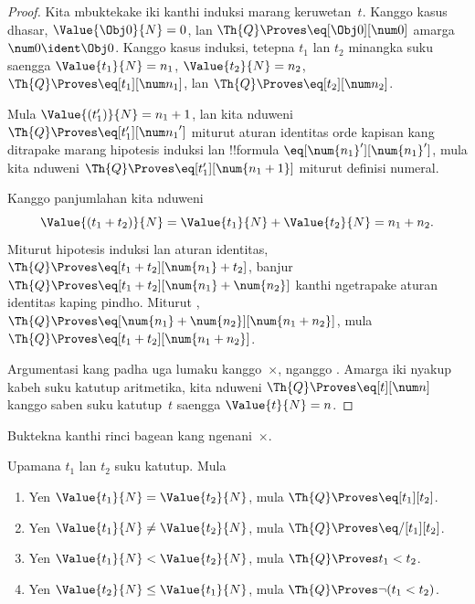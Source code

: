\documentclass[../../../include/open-logic-section]{subfiles}
\begin{document}
\begin{proof}
Kita mbuktekake iki kanthi induksi marang keruwetan~$t$. Kanggo kasus
dhasar, $\Value{\Obj 0}{N} = 0$, lan
$\Th{Q} \Proves \eq[\Obj 0][\num 0]$ amarga
$\num 0 \ident \Obj 0$.
%
Kanggo kasus induksi, tetepna $t_1$ lan $t_2$ minangka suku saengga
$\Value{t_1}{N} = n_1$, $\Value{t_2}{N} = n_2$,
$\Th{Q} \Proves \eq[t_1][\num n_1]$, lan
$\Th{Q} \Proves \eq[t_2][\num n_2]$.

Mula $\Value{(t_1')}{N} = n_1 + 1$, lan kita nduweni
$\Th{Q} \Proves \eq[t_1'][{\num n_1}']$ miturut aturan identitas
orde kapisan kang ditrapake marang hipotesis induksi lan !!{formula}
$\eq[\num{n_1}'][\num{n_1}']$,
mula kita nduweni $\Th{Q} \Proves \eq[t_1'][\num{n_1 + 1}]$
miturut definisi numeral.

Kanggo panjumlahan kita nduweni
\[
      \Value{(t_1 + t_2)}{N}
    = \Value{t_1}{N} + \Value{t_2}{N}
    = n_1 + n_2.
\]
Miturut hipotesis induksi lan aturan identitas,
$\Th{Q} \Proves \eq[t_1 + t_2][\num{n_1} + t_2]$, banjur
$\Th{Q} \Proves \eq[t_1 + t_2][\num{n_1} + \num{n_2}]$
kanthi ngetrapake aturan identitas kaping pindho.
Miturut ,
$\Th{Q} \Proves \eq[\num{n_1} + \num{n_2}][\num{n_1 + n_2}]$,
mula $\Th{Q} \Proves \eq[t_1 + t_2][\num{n_1 + n_2}]$.

Argumentasi kang padha uga lumaku kanggo~$\times$, nganggo
.
%
Amarga iki nyakup kabeh suku katutup aritmetika, kita nduweni
$\Th{Q} \Proves \eq[t][\num n]$ kanggo saben suku katutup~$t$
saengga $\Value{t}{N} = n$.
\end{proof}

\begin{prob}
Buktekna kanthi rinci bagean 
kang ngenani~$\times$.
\end{prob}

\begin{lem}
Upamana $t_1$ lan $t_2$ suku katutup. Mula
\begin{enumerate}
\item Yen $\Value{t_1}{N} = \Value{t_2}{N}$,
    mula $\Th{Q} \Proves \eq[t_1][t_2]$.
\item Yen $\Value{t_1}{N} \neq \Value{t_2}{N}$,
    mula $\Th{Q} \Proves \eq/[t_1][t_2]$.
\item Yen $\Value{t_1}{N} < \Value{t_2}{N}$,
    mula $\Th{Q} \Proves t_1 < t_2$.
\item Yen $\Value{t_2}{N} \leq \Value{t_1}{N}$,
    mula $\Th{Q} \Proves \lnot(t_1 < t_2)$.
\end{enumerate}
\end{lem}
\end{document}
